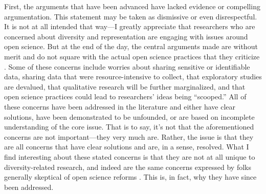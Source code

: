 \documentclass[authordate, empirical]{jote-new-article}
\begin{document}
First, the arguments that have been advanced have lacked evidence or compelling argumentation. This statement may be taken as dismissive or even disrespectful. It is not at all intended that way—I greatly appreciate that researchers who are concerned about diversity and representation are engaging with issues around open science. But at the end of the day, the central arguments made are without merit and do not square with the actual open science practices that they criticize \parencites[e.g.,][]{Bahlai2019}{FoxTree2022}{Fuentes2022}{Grzanka2021}. Some of these concerns include worries about sharing sensitive or identifiable data, sharing data that were resource-intensive to collect, that exploratory studies are devalued, that qualitative research will be further marginalized, and that open science practices could lead to researchers' ideas being “scooped.” All of these concerns have been addressed in the literature and either have clear solutions, have been demonstrated to be unfounded, or are based on incomplete understanding of the core issue. That is to say, it's not that the aforementioned concerns are not important—they very much are. Rather, the issue is that they are all concerns that have clear solutions and are, in a sense, resolved. What I find interesting about these stated concerns is that they are not at all unique to diversity-related research, and indeed are the same concerns expressed by folks generally skeptical of open science reforms \parencites[see][for a discussion in the context of clinical psychology]{Tackett2017}. This is, in fact, why they have since been addressed.
\end{document}
